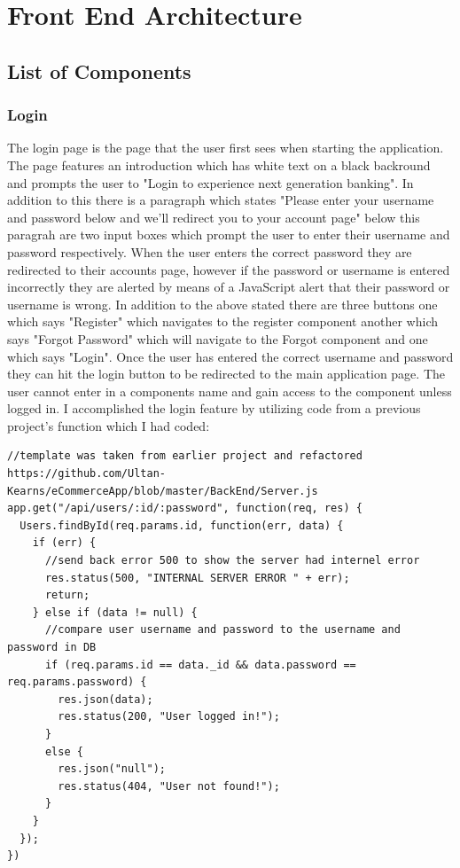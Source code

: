 \section{Front End Architecture}
\subsection{List of Components}
\subsubsection{Login}
The login page is the page that the user first sees when starting the application.  The page features an introduction which has white text on a black backround and prompts the user to "Login to experience next generation banking".  In addition to this there is a paragraph which states "Please enter your username and password below and we'll redirect you to your account page"  below this paragrah are two input boxes which prompt the user to enter their username and password respectively.  When the user enters the correct password they are redirected to their accounts page, however if the password or username is entered incorrectly they are alerted by means of a JavaScript alert that their password or username is wrong.  In addition to the above stated there are three buttons one which says "Register" which navigates to the register component another which says "Forgot Password" which will navigate to the Forgot component and one which says "Login".  Once the user has entered the correct username and password they can hit the login button to be redirected to the main application page.  The user cannot enter in a components name and gain access to the component unless logged in.  I accomplished the login feature by utilizing code from a previous project's function which I had coded:
\begin{verbatim}
//template was taken from earlier project and refactored https://github.com/Ultan-Kearns/eCommerceApp/blob/master/BackEnd/Server.js
app.get("/api/users/:id/:password", function(req, res) {
  Users.findById(req.params.id, function(err, data) {
    if (err) {
      //send back error 500 to show the server had internel error
      res.status(500, "INTERNAL SERVER ERROR " + err);
      return;
    } else if (data != null) {
      //compare user username and password to the username and password in DB
      if (req.params.id == data._id && data.password == req.params.password) {
        res.json(data);
        res.status(200, "User logged in!");
      }
      else {
        res.json("null");
        res.status(404, "User not found!");
      }
    }
  });
})
\end{verbatim}
